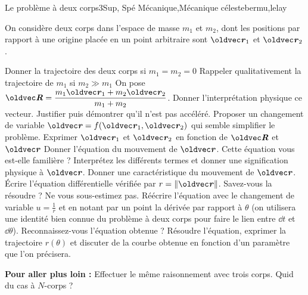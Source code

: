 
\begin{exercise}{Le problème à deux corps}{3}{Sup, Spé}
{Mécanique,Mécanique céleste}{bermu,lelay}

On considère deux corps dans l'espace de masse $m_1$ et $m_2$, dont les positions par rapport à une origine placée en un point arbitraire sont $\vr_1$ et $\vr_2$.

\begin{questions}
    \question Donner la trajectoire des deux corps si $m_1 = m_2 = 0$
    \question Rappeler qualitativement la trajectoire de $m_1$ si $m_2 \gg m_1$
    \question On pose $\vR = \dfrac{m_1\vr_1 + m_2\vr_2}{m_1+m_2}$. Donner l'interprétation physique ce vecteur. Justifier puis démontrer qu'il n'est pas accéléré.
    \question Proposer un changement de variable $\vr = f(\vr_1, \vr_2)$ qui semble simplifier le problème.
    \question Exprimer $\vr_1$ et $\vr_2$ en fonction de $\vR$ et $\vr$
    \question Donner l'équation du mouvement de $\vr$. Cette équation vous est-elle familière ? Interprétez les différents termes et donner une signification physique à $\vr$.
    \question Donner une caractéristique du mouvement de $\vr$. Écrire l'équation différentielle vérifiée par $r = \| \vr \|$. Savez-vous la résoudre ?
    \question Ne vous sous-estimez pas. Réécrire l'équation avec le changement de variable $u = \frac1r$ et en notant par un point la dérivée par rapport à $\theta$ (on utilisera une identité bien connue du problème à deux corps pour faire le lien entre $\dd{t}$ et $\dd{\theta}$). Reconnaissez-vous l'équation obtenue ?
    \question Résoudre l'équation, exprimer la trajectoire $r(\theta)$ et discuter de la courbe obtenue en fonction d'un paramètre que l'on précisera.
\end{questions}
\textbf{Pour aller plus loin :} Effectuer le même raisonnement avec trois corps. Quid du cas à $N$-corps ?
\end{exercise}